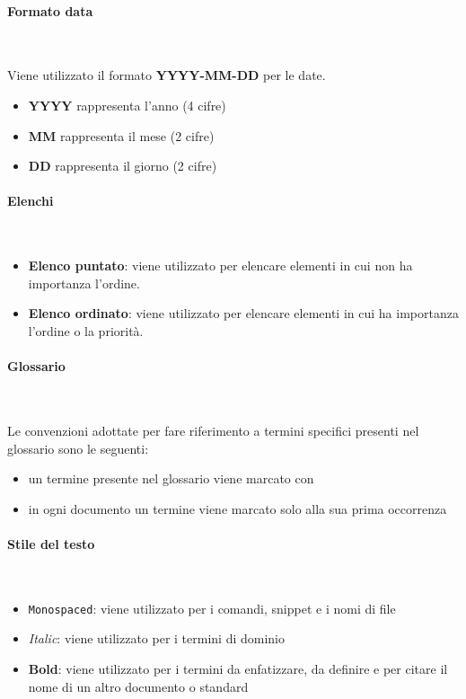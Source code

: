 \paragraph{Formato data} ~

Viene utilizzato il formato \textbf{YYYY-MM-DD} per le date.
\begin{itemize}
    \item \textbf{YYYY} rappresenta l'anno (4 cifre)
    \item \textbf{MM} rappresenta il mese (2 cifre)
    \item \textbf{DD} rappresenta il giorno (2 cifre)
\end{itemize}

\paragraph{Elenchi} ~

\begin{itemize}
    \item \textbf{Elenco puntato}: viene utilizzato per elencare elementi in cui non ha importanza l'ordine.
    \item \textbf{Elenco ordinato}: viene utilizzato per elencare elementi in cui ha importanza l'ordine o la priorità.
\end{itemize}

\paragraph{Glossario} ~

Le convenzioni adottate per fare riferimento a termini specifici presenti nel glossario sono le seguenti:
\begin{itemize}
    \item un termine presente nel glossario viene marcato con \glo
    \item in ogni documento un termine viene marcato solo alla sua prima occorrenza
\end{itemize}

\paragraph{Stile del testo} ~

\begin{itemize}
    \item \texttt{Monospaced}: viene utilizzato per i comandi, snippet e i nomi di file
    \item \textit{Italic}: viene utilizzato per i termini di dominio
    \item \textbf{Bold}: viene utilizzato per i termini da enfatizzare, da definire e per citare il nome di un altro documento o standard
\end{itemize}

